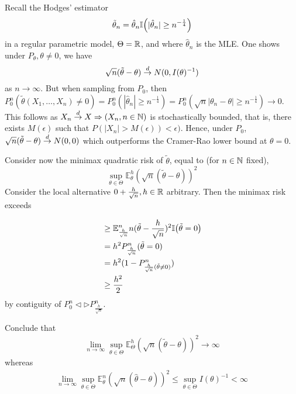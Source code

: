 \begin{exmp}
  \label{defn:parametric_statistical_models:12}
  Recall the Hodges' estimator
  \begin{equation}
    \label{eq:94}
    \tilde \theta_{n} = \hat \theta_{n} \I{|\hat \theta_{n}| \geq n^{-\frac{1}{4}}}
  \end{equation} in a regular parametric model, $\Theta = \mathbb{R}$, and
  where $\hat \theta_{n}$ is the MLE.  One shows under $P_{\theta},
  \theta \neq 0$, we have
  \begin{equation}
    \label{eq:95}
    \sqrt{n}(\tilde \theta - \theta) \overset{d}{\rightarrow} N(0, I(\theta)^{-1})
  \end{equation} as $n \rightarrow \infty$.  But when sampling from
  $P_{0}$, then $P_{0}^{n} (\tilde \theta(X_{1}, \dots, X_{n}) \neq 0)
  = P_{0}^{n}(|\hat \theta_{n}| \geq n^{-\frac{1}{4}}) =
  P_{0}^{n}(\sqrt{n}|\theta_{n} - \theta| \geq n^{-\frac{1}{4}})
  \rightarrow 0$.
  This follows as $X_{n} \overset{d}{\rightarrow} X \Rightarrow (X_{n}, n \in \mathbb{N})$  is
  stochastically bounded, that is, there exists $M(\epsilon)$ such
  that $P(|X_{n}| > M(\epsilon)) < \epsilon)$.  Hence, under $P_{0}$,
  $\sqrt{n}(\tilde \theta - \theta) \overset{d}{\rightarrow} N(0, 0)$ which outperforms the
  Cramer-Rao lower bound at $\theta = 0$.

  Consider now the minimax quadratic risk of $\tilde \theta$, equal to
  (for $n \in \mathbb{N}$ fixed),
  \begin{equation}
    \label{eq:96}
    \sup_{\theta \in \Theta} \mathbb{E}^{h}_{\theta} (\sqrt{n}(\tilde
    \theta - \theta))^{2}
  \end{equation} Consider the local alternative $0 +
  \frac{h}{\sqrt{n}}, h \in \mathbb{R}$ arbitrary.  Then the minimax risk
  exceeds

  \begin{align}
    \label{eq:97}
    &\geq \mathbb{E}^{n}_{\frac{h}{\sqrt{n}}} n(\tilde \theta -
    \frac{h}{\sqrt{n}})^{2} \I{\tilde \theta = 0} \\
    &= h^{2}P_{\frac{h}{\sqrt{n}}}^{n}(\tilde \theta = 0) \\
    &= h^{2}(1 - P^{n}_{\frac{h}{\sqrt{n}}(\tilde \theta \neq 0)}) \\
    &\geq \frac{h^{2}}{2}
  \end{align} by contiguity of $P_{0}^{n} \lhd \rhd P^{n}_{\frac{h}{\sqrt{n}}}$.

  Conclude that
  \begin{align}
    \label{eq:98}
    \lim_{n \rightarrow \infty} \sup_{\theta \in \Theta}
    \mathbb{E}_{\Theta}^{h}(\sqrt{n}(\tilde \theta - \theta))^{2}
    \rightarrow \infty
  \end{align} whereas
  \begin{align}
    \label{eq:99}
    \lim_{n \rightarrow \infty} \sup_{\theta \in \Theta}
    \mathbb{E}^{n}_{\theta}(\sqrt{n}(\hat \theta - \theta))^{2} \leq
    \sup_{\theta \in \Theta} I(\theta)^{-1} < \infty
  \end{align}
\end{exmp}

